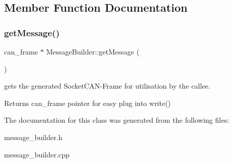 \subsection{Member Function Documentation}
\mbox{\label{classMessageBuilder_a588441e4327872e90c3442e1cecd50c3}} 
\subsubsection{\texorpdfstring{get\+Message()}{getMessage()}}
{\footnotesize\ttfamily can\+\_\+frame $\ast$ Message\+Builder\+::get\+Message (\begin{DoxyParamCaption}{ }\end{DoxyParamCaption})}



gets the generated Socket\+C\+A\+N-\/\+Frame for utilisation by the callee. 

\begin{DoxyReturn}{Returns}
can\+\_\+frame pointer for easy plug into write() 
\end{DoxyReturn}


The documentation for this class was generated from the following files\+:\begin{DoxyCompactItemize}
\item 
message\+\_\+builder.\+h\item 
message\+\_\+builder.\+cpp\end{DoxyCompactItemize}
